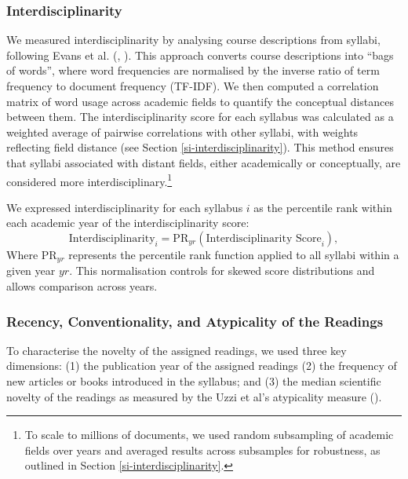 \documentclass[
  british,
  11pt,
]{article}
\begin{document}
\subsubsection{Interdisciplinarity}\label{interdisciplinarity}

We measured interdisciplinarity by analysing course descriptions from syllabi, following Evans et al. (, ). This approach converts course descriptions into ``bags of words'', where word frequencies are normalised by the inverse ratio of term frequency to document frequency (TF-IDF). We then computed a correlation matrix of word usage across academic fields to quantify the conceptual distances between them. The interdisciplinarity score for each syllabus was calculated as a weighted average of pairwise correlations with other syllabi, with weights reflecting field distance (see Section \ref{si-interdisciplinarity}). This method ensures that syllabi associated with distant fields, either academically or conceptually, are considered more interdisciplinary.\footnote{
  To scale to millions of documents, we used random subsampling of academic fields over years and averaged results across subsamples for robustness, as outlined in Section \ref{si-interdisciplinarity}.}

We expressed interdisciplinarity for each syllabus \(i\) as the percentile rank within each academic year of the interdisciplinarity score:
\[
  \text{Interdisciplinarity}_i = \text{PR}_{yr} (\text{Interdisciplinarity Score}_i),
\]
Where \(\text{PR}_{yr}\) represents the percentile rank function applied to all syllabi within a given year \(yr\). This normalisation controls for skewed score distributions and allows comparison across years.

\subsubsection{Recency, Conventionality, and Atypicality of the Readings}\label{recency-conventionality-and-atypicality-of-the-readings}

To characterise the novelty of the assigned readings, we used three key dimensions: (1) the publication year of the assigned readings (2) the frequency of new articles or books introduced in the syllabus; and (3) the median scientific novelty of the readings as measured by the Uzzi et al's atypicality measure ().
\end{document}
